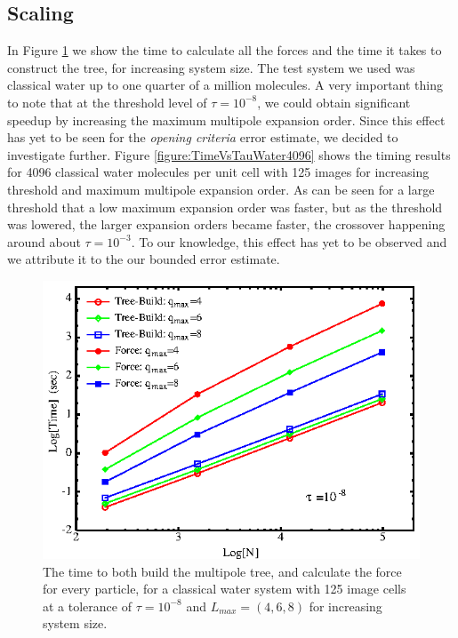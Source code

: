 \documentclass[prb,aps,nobibnotes,twocolumn,doublespace,twocolumngrid,superbib]{revtex4}
\begin{document}
\subsection{Scaling}

In Figure \ref{figure:TimeVsNwater} we show the time to calculate all the forces and the time it takes
to construct the tree, for increasing system size. 
%
The test system we used was classical water up to one quarter of a million molecules. 
%
A very important thing to note that at the  threshold level of $\tau=10^{-8}$, 
we could obtain significant speedup by increasing the maximum multipole expansion order. 
%
Since this effect has yet to be seen for the {\it opening criteria} error estimate, 
we decided to investigate further.
%
Figure \ref{figure:TimeVsTauWater4096} shows the timing results for 4096 classical water molecules 
per unit cell with 125 images for increasing threshold and maximum multipole expansion order. 
%
As can be seen for a large threshold that a low maximum expansion order was faster, but as 
the threshold was lowered, the larger expansion orders became faster, the
crossover happening around about $\tau=10^{-3}$. 
%
To our knowledge, this effect has yet to be observed and we attribute it to
the our bounded error estimate. 


%
%
\begin{figure}
\caption{The time to both build the multipole tree, and calculate the force for every particle, for  
a classical water system with 125 image cells at a tolerance of $\tau=10^{-8}$ and $L_{max}=(4,6,8)$ 
for increasing system size.}
{\centering \includegraphics {Time_vs_N_water_2.ps} \par} 
\label{figure:TimeVsNwater} 
\end{figure}
\end{document}
